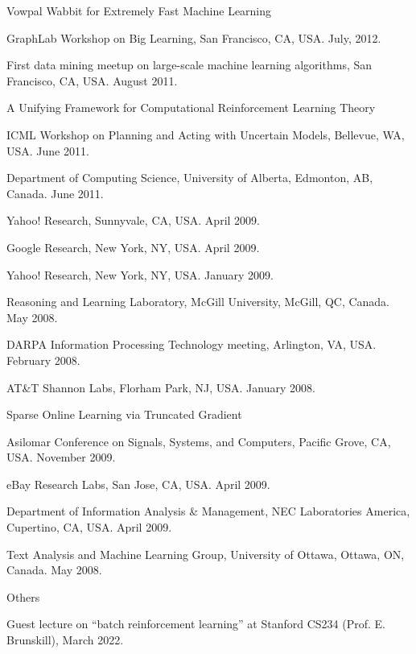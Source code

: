 \documentclass[10pt,twoside,letterpaper]{article}
\newcommand{\negitemspace}{\vspace{1mm}}
\begin{document}
\begin{compactitem}
\item{Vowpal Wabbit for Extremely Fast Machine Learning}
\begin{compactitem}
\item{GraphLab Workshop on Big Learning, San Francisco, CA, USA.  July, 2012.}
\item{First data mining meetup on large-scale machine learning algorithms, San Francisco, CA, USA.  August 2011.}
\end{compactitem} \negitemspace

\item{A Unifying Framework for Computational Reinforcement Learning Theory}
\begin{compactitem}
\item{ICML Workshop on Planning and Acting with Uncertain Models, Bellevue, WA, USA.  June 2011.}
\item{Department of Computing Science, University of Alberta, Edmonton, AB, Canada. June 2011.}
\item{Yahoo! Research, Sunnyvale, CA, USA.  April 2009.}
\item{Google Research, New York, NY, USA.  April 2009.}
\item{Yahoo! Research, New York, NY, USA.  January 2009.}
\item{Reasoning and Learning Laboratory, McGill University,
McGill, QC, Canada.  May 2008.}
\item{DARPA Information Processing Technology meeting, Arlington, VA, USA.  February 2008.}
\item{AT\&T Shannon Labs, Florham Park, NJ, USA.  January 2008.}
\end{compactitem} \negitemspace

\item{Sparse Online Learning via Truncated Gradient}
\begin{compactitem}
\item{Asilomar Conference on Signals, Systems, and Computers,
Pacific Grove, CA, USA.  November 2009.}
\item{eBay Research Labs, San Jose, CA, USA.  April 2009.}
\item{Department of Information Analysis \& Management, NEC
Laboratories America, Cupertino, CA, USA.  April 2009.}
\item{Text Analysis and Machine Learning Group, University of
Ottawa, Ottawa, ON, Canada.  May 2008.}
\end{compactitem} \negitemspace

\item{Others}
\begin{compactitem}
\item{Guest lecture on ``batch reinforcement learning'' at Stanford CS234 (Prof. E. Brunskill), March 2022.}
\end{compactitem}

\end{compactitem}
\end{document}

